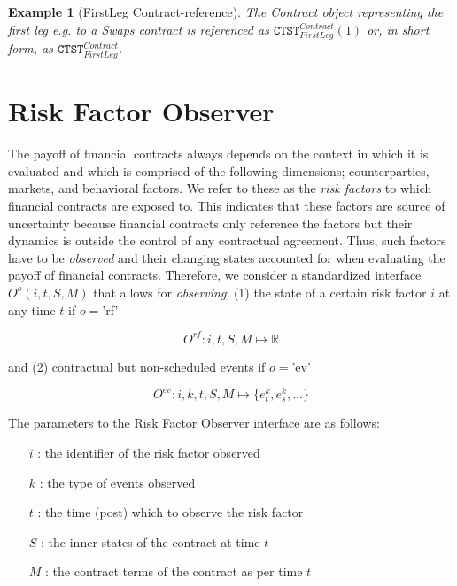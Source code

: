 \documentclass[9pt,oneside]{amsart}
\newtheorem{example}{Example}
\newcommand{\Real}{\mathbb{R}}
\newcommand{\attr}[1]{\texttt{#1}}
\newcommand{\obsfull}[5]{O^{#1}(#2,#3,#4,#5)}
\newcommand{\obsfunc}[1]{O^{#1}}
\begin{document}
\begin{multicols}{2}
\begin{example}[FirstLeg Contract-reference] The Contract object representing the first leg e.g. to a Swaps contract is referenced as $\attr{CTST}_{FirstLeg}^{Contract}(1)$ or, in short form, as $\attr{CTST}_{FirstLeg}^{Contract}$.
\end{example}



\section{Risk Factor Observer}\label{sec:rfobserver}

The payoff of financial contracts always depends on the context in which it is evaluated and which is comprised of the following dimensions; counterparties, markets, and behavioral factors. We refer to these as the \textit{risk factors} to which financial contracts are exposed to. This indicates that these factors are source of uncertainty because financial contracts only reference the factors but their dynamics is outside the control of any contractual agreement. Thus, such factors have to be \textit{observed} and their changing states accounted for when evaluating the payoff of financial contracts. Therefore, we consider a standardized interface $\obsfull{o}{i}{t}{S}{M}$ that allows for \textit{observing}; (1) the state of a certain risk factor $i$ at any time $t$ if $o=$'rf'

\[
	\obsfunc{rf}: i,t,S,M \mapsto \Real
\]

and (2) contractual but non-scheduled events if $o=$'ev'

\[
	\obsfunc{ev}: i,k,t,S,M \mapsto \{e_t^{k},e_s^{k},...\}
\]

The parameters to the Risk Factor Observer interface are as follows:

\begin{itemize}
	\item[$i$]: the identifier of the risk factor observed

	\item[$k$]: the type of events observed

	\item[$t$]: the time (post) which to observe the risk factor

	\item [$S$]: the inner states of the contract at time $t$

	\item [$M$]: the contract terms of the contract as per time $t$
\end{itemize}


\end{multicols}
\end{document}
